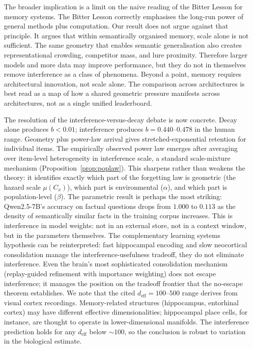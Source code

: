 \documentclass[11pt]{article}
\begin{document}
The broader implication is a limit on the naive reading of the Bitter Lesson for memory systems. The Bitter Lesson correctly emphasises the long-run power of general methods plus computation. Our result does not argue against that principle. It argues that within semantically organised memory, scale alone is not sufficient. The same geometry that enables semantic generalisation also creates representational crowding, competitor mass, and lure proximity. Therefore larger models and more data may improve performance, but they do not in themselves remove interference as a class of phenomena. Beyond a point, memory requires architectural innovation, not scale alone. The comparison across architectures is best read as a map of how a shared geometric pressure manifests across architectures, not as a single unified leaderboard.

The resolution of the interference-versus-decay debate\cite{wixted1991,bjork1992} is now concrete. Decay alone produces $b < 0.01$; interference produces $b = 0.440$--$0.478$ in the human range. Geometry plus power-law arrival gives stretched-exponential retention for individual items. The empirically observed power law emerges after averaging over item-level heterogeneity in interference scale, a standard scale-mixture mechanism (Proposition~\ref{prop:poplaw}). This sharpens rather than weakens the theory: it identifies exactly which part of the forgetting law is geometric (the hazard scale $\mu(C_x)$), which part is environmental ($\alpha$), and which part is population-level ($\beta$). The parametric result is perhaps the most striking: Qwen2.5-7B's accuracy on factual questions drops from $1.000$ to $0.113$ as the density of semantically similar facts in the training corpus increases. This is interference in model weights: not in an external store, not in a context window, but in the parameters themselves. The complementary learning systems hypothesis\cite{mcclelland1995} can be reinterpreted: fast hippocampal encoding and slow neocortical consolidation manage the interference-usefulness tradeoff, they do not eliminate interference. Even the brain's most sophisticated consolidation mechanism (replay-guided refinement with importance weighting\cite{mcclelland1995}) does not escape interference; it manages the position on the tradeoff frontier that the no-escape theorem establishes. We note that the cited $d_\text{eff} = 100$--$500$ range derives from visual cortex recordings\cite{stringer2019,gao2017}. Memory-related structures (hippocampus, entorhinal cortex) may have different effective dimensionalities; hippocampal place cells, for instance, are thought to operate in lower-dimensional manifolds. The interference prediction holds for any $d_\text{eff}$ below ${\sim}100$, so the conclusion is robust to variation in the biological estimate.
\end{document}
